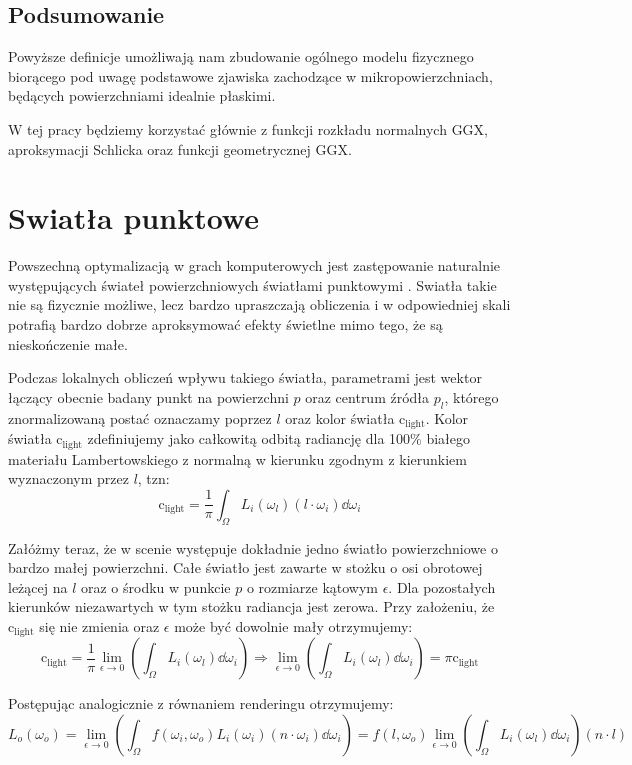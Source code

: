 \documentclass[../main.tex]{subfiles}
\newcommand{\clightcolor}{\text{c}_{\text{light}}}
\begin{document}
\subsection{Podsumowanie}

Powyższe definicje umożliwają nam zbudowanie ogólnego modelu fizycznego
biorącego pod uwagę podstawowe zjawiska zachodzące w mikropowierzchniach,
będących powierzchniami idealnie płaskimi.

W tej pracy będziemy korzystać głównie z funkcji rozkładu normalnych GGX,
aproksymacji Schlicka oraz funkcji geometrycznej GGX.


\section{Swiatła punktowe}

Powszechną optymalizacją w grach komputerowych jest zastępowanie naturalnie występujących świateł powierzchniowych światłami punktowymi \cite{pbr_background}. Swiatła takie nie są fizycznie możliwe, lecz bardzo upraszczają obliczenia i w odpowiedniej skali potrafią bardzo dobrze aproksymować efekty świetlne mimo tego, że są nieskończenie małe.

Podczas lokalnych obliczeń wpływu takiego światła, parametrami jest wektor łączący obecnie badany punkt na powierzchni $p$ oraz centrum źródła $p_l$, którego znormalizowaną postać oznaczamy poprzez $l$ oraz kolor światła $\clightcolor$. Kolor światła $\clightcolor$ zdefiniujemy jako całkowitą odbitą radiancję dla 100\% białego materiału Lambertowskiego z normalną w kierunku zgodnym z kierunkiem wyznaczonym przez $l$, tzn:
\[
	\clightcolor = \frac{1}{\pi} \int_{\Omega} { L_i(\omega_l) (l \cdot \omega_i) \dd\omega_i }
\]

Załóżmy teraz, że w scenie występuje dokładnie jedno światło powierzchniowe o bardzo małej powierzchni. Całe światło jest zawarte w stożku o osi obrotowej leżącej na $l$ oraz o środku w punkcie $p$ o rozmiarze kątowym $\epsilon$. Dla pozostałych kierunków niezawartych w tym stożku radiancja jest zerowa. Przy założeniu, że $\clightcolor$ się nie zmienia oraz $\epsilon$ może być dowolnie mały otrzymujemy:
\[
	\clightcolor = \frac{1}{\pi} \lim_{\epsilon \rightarrow 0} \left(
		\int_{\Omega} { L_i(\omega_l) } \dd\omega_i
	\right)
	\Rightarrow
	\lim_{\epsilon \rightarrow 0} \left(\int_{\Omega} { L_i(\omega_l) } \dd\omega_i \right) = \pi\clightcolor
\]

Postępując analogicznie z równaniem renderingu otrzymujemy:
\[
	L_o(\omega_o) = \lim_{\epsilon \rightarrow 0} \left(
		\int_{\Omega}{ f(\omega_i, \omega_o) L_i(\omega_i) (n \cdot \omega_i) } \dd\omega_i
	\right) =
	 f(l, \omega_o) \lim_{\epsilon \rightarrow 0} \left(
	 	\int_{\Omega} { L_i(\omega_l) } \dd\omega_i
	 \right)
	 (n \cdot l)
\]
\end{document}
